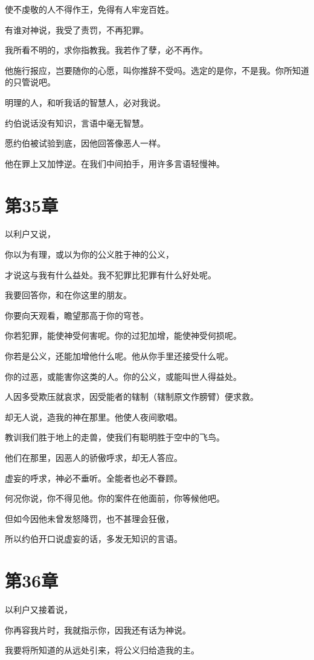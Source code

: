 \documentclass[12pt,oneside]{book}
\begin{document}
使不虔敬的人不得作王，免得有人牢宠百姓。

有谁对神说，我受了责罚，不再犯罪。

我所看不明的，求你指教我。我若作了孽，必不再作。

他施行报应，岂要随你的心愿，叫你推辞不受吗。选定的是你，不是我。你所知道的只管说吧。

明理的人，和听我话的智慧人，必对我说。

约伯说话没有知识，言语中毫无智慧。

愿约伯被试验到底，因他回答像恶人一样。

他在罪上又加悖逆。在我们中间拍手，用许多言语轻慢神。


\chapter{第35章}
以利户又说，

你以为有理，或以为你的公义胜于神的公义，

才说这与我有什么益处。我不犯罪比犯罪有什么好处呢。

我要回答你，和在你这里的朋友。

你要向天观看，瞻望那高于你的穹苍。

你若犯罪，能使神受何害呢。你的过犯加增，能使神受何损呢。

你若是公义，还能加增他什么呢。他从你手里还接受什么呢。

你的过恶，或能害你这类的人。你的公义，或能叫世人得益处。

人因多受欺压就哀求，因受能者的辖制（辖制原文作膀臂）便求救。

却无人说，造我的神在那里。他使人夜间歌唱。

教训我们胜于地上的走兽，使我们有聪明胜于空中的飞鸟。

他们在那里，因恶人的骄傲呼求，却无人答应。

虚妄的呼求，神必不垂听。全能者也必不眷顾。

何况你说，你不得见他。你的案件在他面前，你等候他吧。

但如今因他未曾发怒降罚，也不甚理会狂傲，

所以约伯开口说虚妄的话，多发无知识的言语。


\chapter{第36章}
以利户又接着说，

你再容我片时，我就指示你，因我还有话为神说。

我要将所知道的从远处引来，将公义归给造我的主。
\end{document}
